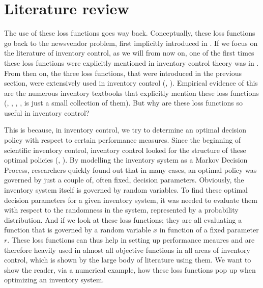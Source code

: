\documentclass{article}
\begin{document}
\section{Literature review}
\begin{flushleft}
    The use of these loss functions goes way back. Conceptually, these loss functions go back to the newsvendor problem, first implicitly introduced in \cite{745ab1c9-7630-3ecd-b4b1-574fb6a20b59}.
    If we focus on the literature of inventory control, as we will from now on, one of the first times these loss functions were explicitly mentioned in inventory control theory was in \cite{brown1967decision}.
    From then on, the three loss functions, that were introduced in the previous section, were extensively used in inventory control (\cite{Rossi_2014}, \cite{b07c7eb1-7b50-3adc-9ee9-442be763eb69}).
    Empirical evidence of this are the numerous inventory textbooks that explicitly mention these loss functions (\cite{RePEc:spr:isorms:978-3-319-15729-0}, \cite{brown1967decision}, \cite{nahmias2015production}, \cite{silver1998inventory}, \cite{zipkin2000foundations} is just a small collection of them).
    But why are these loss functions so useful in inventory control?
\end{flushleft}
\begin{flushleft}
    This is because, in inventory control, we try to determine an optimal decision policy with respect to certain performance measures.
    Since the beginning of scientific inventory control, inventory control looked for the structure of these optimal policies (\cite{33fd5e2d-8428-3331-b206-ff93e51b7613}, \cite{Scarf1960}).
    By modelling the inventory system as a Markov Decision Process, researchers quickly found out that in many cases, an optimal policy was governed by just a couple of, often fixed, decision parameters.
    Obviously, the inventory system itself is governed by random variables. To find these optimal decision parameters for a given inventory system, it was needed to evaluate them with respect to the randomness in the system, represented by a probability distribution.
    And if we look at these loss functions; they are all evaluating a function that is governed by a random variable $x$ in function of a fixed parameter $r$.
    These loss functions can thus help in setting up performance meaures and are therefore heavily used in almost all objective functions in all areas of inventory control, which is shown by the large body of literature using them.
    We want to show the reader, via a numerical example, how these loss functions pop up when optimizing an inventory system.
\end{flushleft}
\end{document}
